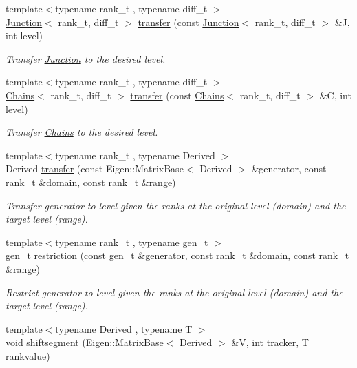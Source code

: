 \begin{DoxyCompactItemize}
{\footnotesize template$<$typename rank\+\_\+t , typename diff\+\_\+t $>$ }\\\hyperlink{classMackey_1_1Junction}{Junction}$<$ rank\+\_\+t, diff\+\_\+t $>$ \hyperlink{namespaceMackey_a914aba7f868e67ae3fd9da3995678660}{transfer} (const \hyperlink{classMackey_1_1Junction}{Junction}$<$ rank\+\_\+t, diff\+\_\+t $>$ \&J, int level)
\begin{DoxyCompactList}\small\item\em Transfer \hyperlink{classMackey_1_1Junction}{Junction} to the desired level. \end{DoxyCompactList}\item 
{\footnotesize template$<$typename rank\+\_\+t , typename diff\+\_\+t $>$ }\\\hyperlink{classMackey_1_1Chains}{Chains}$<$ rank\+\_\+t, diff\+\_\+t $>$ \hyperlink{namespaceMackey_a50837580391b5c6705e23c637d742b22}{transfer} (const \hyperlink{classMackey_1_1Chains}{Chains}$<$ rank\+\_\+t, diff\+\_\+t $>$ \&C, int level)
\begin{DoxyCompactList}\small\item\em Transfer \hyperlink{classMackey_1_1Chains}{Chains} to the desired level. \end{DoxyCompactList}\item 
{\footnotesize template$<$typename rank\+\_\+t , typename Derived $>$ }\\Derived \hyperlink{namespaceMackey_a0550bf97e47b3c319cb5e1bd81008d89}{transfer} (const Eigen\+::\+Matrix\+Base$<$ Derived $>$ \&generator, const rank\+\_\+t \&domain, const rank\+\_\+t \&range)
\begin{DoxyCompactList}\small\item\em Transfer generator to level given the ranks at the original level (domain) and the target level (range). \end{DoxyCompactList}\item 
{\footnotesize template$<$typename rank\+\_\+t , typename gen\+\_\+t $>$ }\\gen\+\_\+t \hyperlink{namespaceMackey_ad1e907ff76b07d4fc4c9d4bdf25918bd}{restriction} (const gen\+\_\+t \&generator, const rank\+\_\+t \&domain, const rank\+\_\+t \&range)
\begin{DoxyCompactList}\small\item\em Restrict generator to level given the ranks at the original level (domain) and the target level (range). \end{DoxyCompactList}\item 
{\footnotesize template$<$typename Derived , typename T $>$ }\\void \hyperlink{namespaceMackey_aab8a6292210a3b71960cb03b79d218e6}{shiftsegment} (Eigen\+::\+Matrix\+Base$<$ Derived $>$ \&V, int tracker, T rankvalue)

\end{DoxyCompactItemize}
